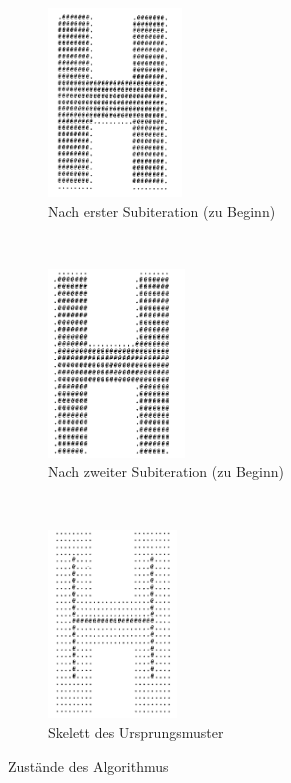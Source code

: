 \begin{figure}[!ht]
        \centering
        \begin{subfigure}[b]{0.3\textwidth}
                \centering
                 \includegraphics[height=5cm]{Res/SuedOst.png}
                \caption{Nach erster Subiteration (zu Beginn)  }
               
        \end{subfigure}%
        ~ %
        \begin{subfigure}[b]{0.3\textwidth}
                \centering
                \includegraphics[height=5cm]{Res/NordWest.png}
                \caption{Nach zweiter Subiteration (zu Beginn)}
               
        \end{subfigure}
        ~ %
        \begin{subfigure}[b]{0.3\textwidth}
                \centering
                \includegraphics[height=5cm]{Res/Skelett.png}
                \caption{Skelett des Ursprungsmuster}
               
        \end{subfigure}
        \caption{Zustände des Algorithmus}
\end{figure}

